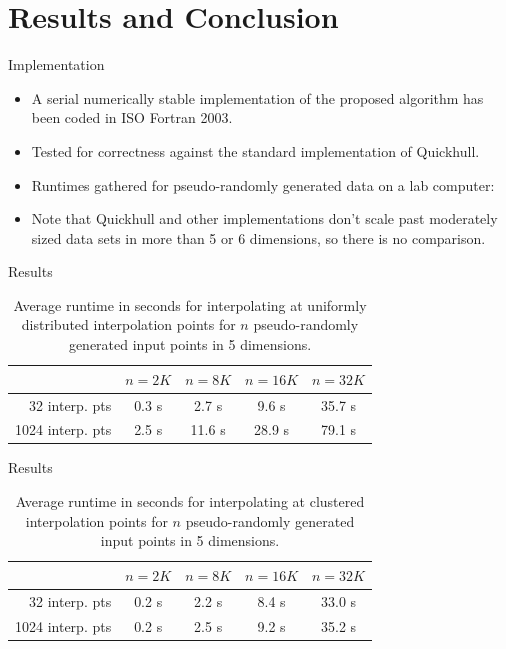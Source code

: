 \documentclass[xcolor=dvipsnames]{beamer}
\begin{document}
\section{Results and Conclusion}
\begin{frame}{Implementation}
\begin{itemize}
\item A serial numerically stable implementation of the proposed algorithm has
been coded in ISO Fortran 2003.
\item Tested for correctness against the standard implementation of Quickhull.
\item Runtimes gathered for pseudo-randomly generated data on a lab computer:
\item Note that Quickhull and other implementations don't scale past moderately
sized data sets in more than 5 or 6 dimensions, so there is no comparison.
\end{itemize}
\end{frame}
\begin{frame}{Results}
\begin{table}[htb]
\caption{Average runtime in seconds for interpolating at uniformly distributed
interpolation points for $n$ pseudo-randomly generated input points in 5
dimensions.}
\label{tab:uniform}
\centering
\begin{tabular}{r|cccc}
  & $n=2K$ & $n=8K$ & $n=16K$ & $n=32K$\\
\hline
32 interp. pts & 0.3 s & 2.7 s & 9.6 s & 35.7 s\\
1024 interp. pts & 2.5 s & 11.6 s & 28.9 s & 79.1 s\\
\end{tabular}
\end{table}
\end{frame}
\begin{frame}{Results}
\begin{table}[htb]
\caption{Average runtime in seconds for interpolating at clustered interpolation
points for $n$ pseudo-randomly generated input points in 5 dimensions.}
\label{tab:cluster}
\centering
\begin{tabular}{r|cccc}
  & $n=2K$ & $n=8K$ & $n=16K$ & $n=32K$\\
\hline
32 interp. pts & 0.2 s & 2.2 s & 8.4 s & 33.0 s\\
1024 interp. pts & 0.2 s & 2.5 s & 9.2 s & 35.2 s\\
\end{tabular}
\end{table}
\end{frame}
\end{document}
